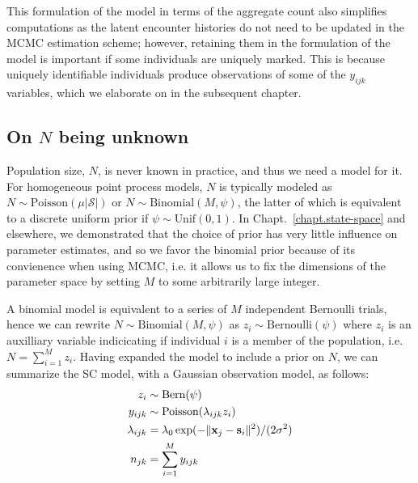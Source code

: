 This formulation of the model in terms of the aggregate count also
simplifies computations as the latent encounter histories
do not need to be updated in the MCMC estimation
scheme; however, retaining them in the formulation of the model
is important if some individuals are uniquely marked. %
This is because
uniquely identifiable individuals produce
observations of some of the $y_{ijk}$ variables, which we elaborate
on in the subsequent chapter.



\subsection{On $N$ being unknown}
\label{unmarked.sec.N}

Population size, $N$, is never known in practice, and thus %
we need a model for it. For homogeneous point process models,
$N$ is typically modeled as
$N \sim \text{Poisson}(\mu|\mathcal{S}|)$ or
$N \sim \text{Binomial}(M, \psi)$, the latter of which is equivalent
to a discrete uniform prior if $\psi \sim \text{Unif}(0,1)$. In
Chapt.~\ref{chapt.state-space} and elsewhere, we demonstrated that
the choice of prior has very little influence on parameter estimates,
and so we favor the binomial prior because of its convienence when
using MCMC, i.e. it allows us to fix the
dimensions of the parameter space by setting $M$ to some arbitrarily
large integer.

A binomial model is
equivalent to a series of $M$ independent Bernoulli trials, hence
we can rewrite $N \sim \text{Binomial}(M, \psi)$ as $z_i \sim
\text{Bernoulli}(\psi)$ where $z_i$ is an auxilliary variable
indicicating if individual $i$ is a member of the population, i.e. $N =
\sum_{i=1}^M z_i$. Having expanded the model to include a prior on $N$, we
can summarize the SC model, with a Gaussian observation model, as follows:
\begin{align*}
  z_i &\sim \text{Bern}(\psi) \\
  y_{ijk} &\sim \text{Poisson}(\lambda_{ijk} z_i) \\
  \lambda_{ijk} &= \lambda_0\exp(-\|{\bf x}_j - {\bf s}_i\|^2)/(2\sigma^2) \\
  n_{jk} &= \sum_{i=1}^M y_{ijk} %
\end{align*}



